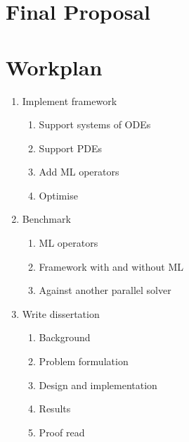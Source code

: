 \documentclass{article}
\begin{document}
\section{Final Proposal}



\section{Workplan}

\begin{enumerate}
    \item Implement framework
        \begin{enumerate}
        	\item Support systems of ODEs
        	\item Support PDEs
        	\item Add ML operators
        	\item Optimise
        \end{enumerate}
    \item Benchmark
        \begin{enumerate}
        	\item ML operators
        	\item Framework with and without ML
        	\item Against another parallel solver
        \end{enumerate}
    \item Write dissertation
        \begin{enumerate}
        	\item Background
        	\item Problem formulation
        	\item Design and implementation
        	\item Results
        	\item Proof read
        \end{enumerate}
\end{enumerate}
\end{document}
